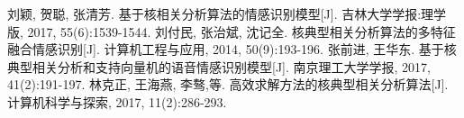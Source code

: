 \documentclass[10pt,a4paper,twocolumn]{PPRAcn} %
\begin{document}
\flushbottom %

\maketitle %


\thispagestyle{empty} %




\small
\renewcommand\refname{参考文献}
%
%

\begin{thebibliography}{99}
刘颖, 贺聪, 张清芳. 基于核相关分析算法的情感识别模型[J]. 吉林大学学报:理学版, 2017, 55(6):1539-1544.
刘付民, 张治斌, 沈记全. 核典型相关分析算法的多特征融合情感识别[J]. 计算机工程与应用, 2014, 50(9):193-196.
张前进, 王华东. 基于核典型相关分析和支持向量机的语音情感识别模型[J]. 南京理工大学学报, 2017, 41(2):191-197.  
林克正, 王海燕, 李骜,等. 高效求解方法的核典型相关分析算法[J]. 计算机科学与探索, 2017, 11(2):286-293.
\end{thebibliography}
\end{document}
